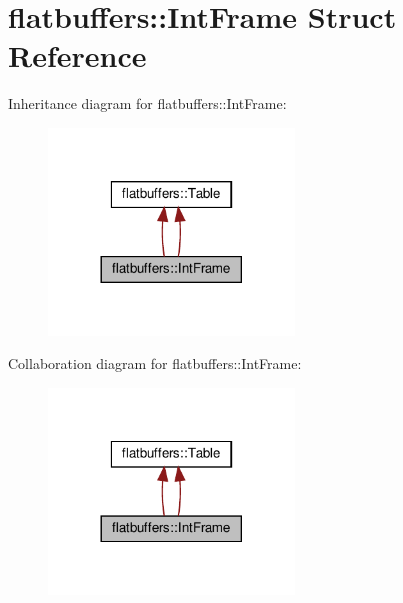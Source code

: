 \hypertarget{structflatbuffers_1_1IntFrame}{}\section{flatbuffers\+:\+:Int\+Frame Struct Reference}
\label{structflatbuffers_1_1IntFrame}


Inheritance diagram for flatbuffers\+:\+:Int\+Frame\+:
\nopagebreak
\begin{figure}[H]
\begin{center}
\leavevmode
\includegraphics[width=185pt]{structflatbuffers_1_1IntFrame__inherit__graph}
\end{center}
\end{figure}


Collaboration diagram for flatbuffers\+:\+:Int\+Frame\+:
\nopagebreak
\begin{figure}[H]
\begin{center}
\leavevmode
\includegraphics[width=185pt]{structflatbuffers_1_1IntFrame__coll__graph}
\end{center}
\end{figure}
